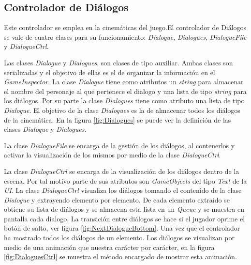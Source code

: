 \subsection{Controlador de Diálogos}\label{ControladorDialogo}
Este controlador se emplea en la cinemáticas del juego.El controlador de 
Diálogos se vale de cuatro clases para su funcionamiento: 
\textit{Dialogue}, \textit{Dialogues}, \textit{DialogueFile} y 
\textit{DialogueCtrl}. 
\\
\par
Las clases \textit{Dialogue} y \textit{Dialogues}, son clases de tipo auxiliar. Ambas clases son serializadas y el objetivo de ellas es el de organizar la información en el \textit{GameInspector}. La clase \textit{Dialogue} tiene como atributos un \textit{string} para almacenar el nombre del personaje al que pertenece el dialogo y una lista de tipo \textit{string} para los diálogos. Por su parte la clase \textit{Dialogues} tiene como atributo una lista de tipo \textit{Dialogue}. El objetivo de la clase \textit{Dialogues} es la de almacenar todos los diálogos de la cinemática. En la figura \ref{fig:Dialogues} se puede ver la definición de las clases \textit{Dialogue} y \textit{Dialogues}.
\\
\par
La clase \textit{DialogueFile} se encarga de la gestión de los diálogos, al contenerlos y activar la visualización de los mismos por medio de la clase \textit{DialogueCtrl}. 
\\
\par 
La clase \textit{DialogueCtrl} se encarga de la visualización de los diálogos 
dentro de la escena. Por tal motivo parte de sus atributos son 
\textit{GameObjects} del tipo \textit{Text} de la \textit{UI}. La clase 
\textit{DialogueCtrl} visualiza los diálogos tomando el contenido de la clase 
\textit{Dialogue} y extrayendo elemento por elemento. De cada elemento extraído 
se obtiene su lista de diálogos y se almacena esta lista en un \textit{Queue} y 
se muestra en pantalla cada dialogo. La transición entre diálogos se hace si el 
jugador oprime el botón de salto, ver figura \ref{fig:NextDialogueBottom}. Una 
vez que el controlador ha mostrado todos los diálogos de un elemento. Los 
diálogos se visualizan por medio de una animación que nuestra carácter por 
carácter, en la figura \ref{fig:DialoguesCtrl} se muestra el método encargado de 
mostrar esta animación.   

